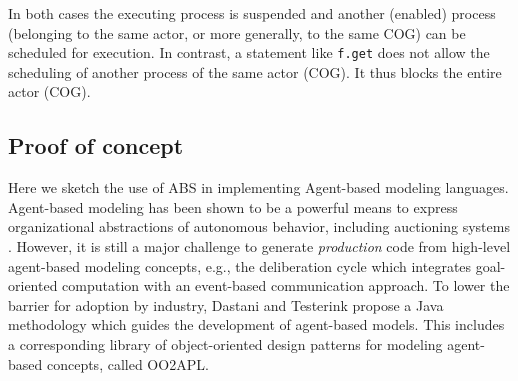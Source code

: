 In both cases  the executing process is suspended and another (enabled) process (belonging to the same actor, or more generally, to the same COG)  can be scheduled for execution.
In contrast,  a statement like \lstinline|f.get| does not allow the scheduling of
another process of the same actor (COG). It thus blocks the entire actor (COG).

%



\subsection{Proof of concept}
\label{ag}
Here we sketch the use of ABS in implementing Agent-based modeling languages.
Agent-based modeling has been shown to be a powerful means to express organizational abstractions of autonomous behavior, including auctioning systems \cite{agent_auction,bas16}.
However, it is still a major challenge to generate  \emph{production} code from  high-level agent-based modeling concepts, e.g., the deliberation cycle which integrates  goal-oriented computation with an event-based communication approach. 
To lower the barrier for adoption by industry, Dastani and Testerink \cite{bas16} propose a Java methodology which guides the development of agent-based models. 
This includes a corresponding library of object-oriented design patterns for modeling agent-based concepts, called OO2APL. 

